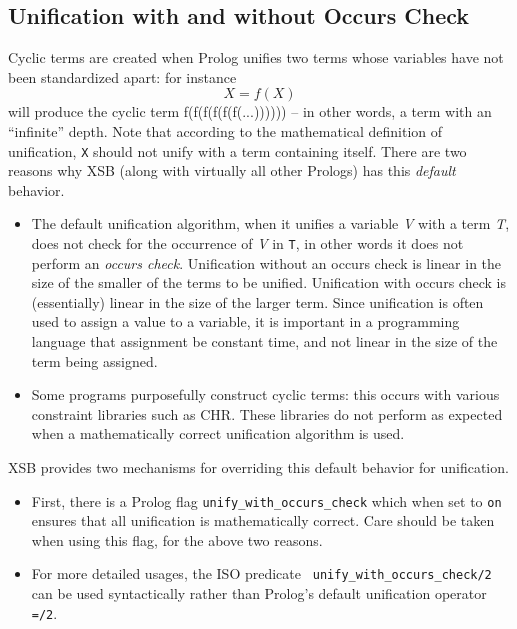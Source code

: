 \subsection{Unification with and without Occurs Check}
%

    Cyclic terms are created when Prolog unifies two terms whose
    variables have not been standardized apart: for instance
\[
    X = f(X)
\]
    will produce the cyclic term f(f(f(f(f(f(...)))))) -- in other
    words, a term with an ``infinite'' depth.  Note that according to
    the mathematical definition of unification, {\tt X} should not
    unify with a term containing itself.  There are two reasons why
    XSB (along with virtually all other Prologs) has this {\em
      default} behavior.

\begin{itemize}
%
\item The default unification algorithm, when it unifies a variable
  {\em V} with a term {\em T}, does not check for the occurrence of
  {\em V} in {\tt T}, in other words it does not perform an {\em
  occurs check}.  Unification without an occurs check is linear in the
  size of the smaller of the terms to be unified.  Unification with
  occurs check is (essentially) linear in the size of the larger term.
  Since unification is often used to assign a value to a variable, it
  is important in a programming language that assignment be constant
  time, and not linear in the size of the term being assigned.
%
\item Some programs purposefully construct cyclic terms: this occurs
  with various constraint libraries such as CHR.  These libraries do
  not perform as expected when a mathematically correct unification
  algorithm is used.
\end{itemize}

XSB provides two mechanisms for overriding this default behavior for
unification.

\begin{itemize}
\item First, there is a Prolog flag {\tt unify\_with\_occurs\_check}
  which when set to {\tt on} ensures that all unification is
  mathematically correct.  Care should be taken when using this flag,
  for the above two reasons.
%
\item For more detailed usages, the ISO predicate {\tt
  unify\_with\_occurs\_check/2} can be used syntactically rather than
  Prolog's default unification operator {\tt =/2}.
\end{itemize}

